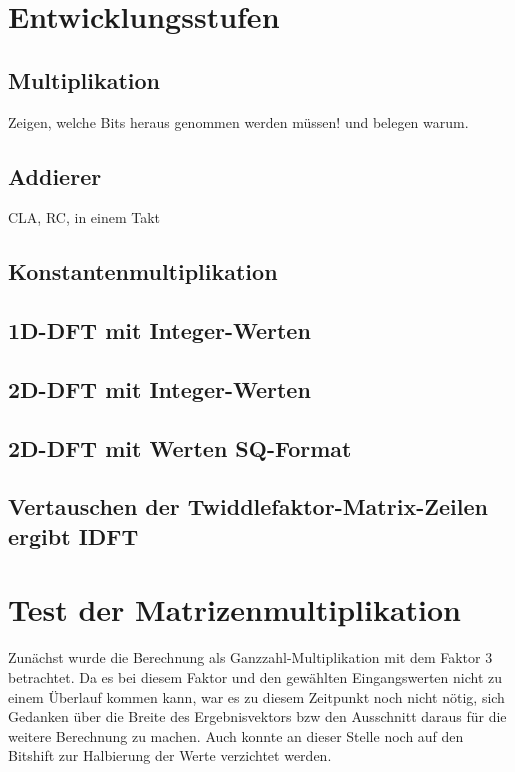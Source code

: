 \section{Entwicklungsstufen}
\subsection{Multiplikation}

Zeigen, welche Bits heraus genommen werden müssen! und belegen warum.

\subsection{Addierer}
CLA, RC, in einem Takt

\subsection{Konstantenmultiplikation}

\subsection{1D-DFT mit Integer-Werten}
 
\subsection{2D-DFT mit Integer-Werten}

\subsection{2D-DFT mit Werten SQ-Format}

\subsection{Vertauschen der Twiddlefaktor-Matrix-Zeilen ergibt IDFT}

\section{Test der Matrizenmultiplikation}
Zunächst wurde die Berechnung als Ganzzahl-Multiplikation mit dem Faktor 3 betrachtet. Da es bei diesem Faktor und den gewählten Eingangswerten nicht zu einem 
Überlauf kommen kann, war es zu diesem Zeitpunkt noch nicht nötig, sich Gedanken über die Breite des Ergebnisvektors bzw den Ausschnitt daraus für die weitere
Berechnung zu machen. Auch konnte an dieser Stelle noch auf den Bitshift zur Halbierung der Werte verzichtet werden.

